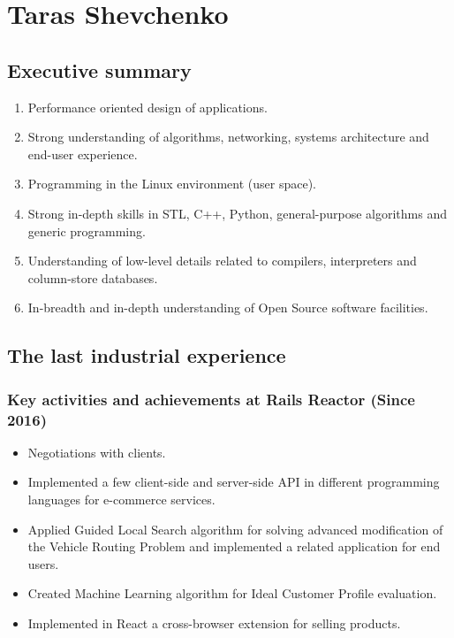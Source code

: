 \documentclass[a4paper,12pt,final]{extreport}
\begin{document}
\section{Taras Shevchenko}
\subsection{Executive summary}
\begin{enumerate}
  \item Performance oriented design of applications.
  \item Strong understanding of algorithms, networking, systems architecture and end-user experience.
  \item Programming in the Linux environment (user space).
  \item Strong in-depth skills in STL, C++, Python, general-purpose algorithms and generic programming.
  \item Understanding of low-level details related to compilers, interpreters and column-store databases.
  \item In-breadth and in-depth understanding of Open Source software facilities.
\end{enumerate}

\subsection{The last industrial experience}
\subsubsection{Key activities and achievements at Rails Reactor (Since 2016)}
\begin{itemize}
  \item Negotiations with clients.
  \item Implemented a few client-side and server-side API in different programming languages for e-commerce services.
  \item Applied Guided Local Search algorithm for solving advanced modification
        of the Vehicle Routing Problem and implemented a related application
        for end users.
  \item Created Machine Learning algorithm for Ideal Customer Profile evaluation.
  \item Implemented in React a cross-browser extension for selling products.
\end{itemize}
\end{document}
